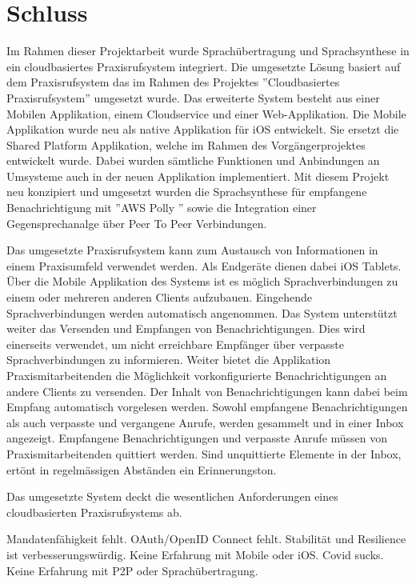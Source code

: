 \section{Schluss}

Im Rahmen dieser Projektarbeit wurde Sprachübertragung und Sprachsynthese in ein cloudbasiertes Praxisrufsystem integriert.
Die umgesetzte Lösung basiert auf dem Praxisrufsystem das im Rahmen des Projektes ''Cloudbasiertes Praxisrufsystem'' umgesetzt wurde.\cite{ip5}
Das erweiterte System besteht aus einer Mobilen Applikation, einem Cloudservice und einer Web-Applikation.
Die Mobile Applikation wurde neu als native Applikation für iOS entwickelt.
Sie ersetzt die Shared Platform Applikation, welche im Rahmen des Vorgängerprojektes entwickelt wurde.
Dabei wurden sämtliche Funktionen und Anbindungen an Umsysteme auch in der neuen Applikation implementiert.
Mit diesem Projekt neu konzipiert und umgesetzt wurden die Sprachsynthese für empfangene Benachrichtigung mit ''AWS Polly '' sowie die Integration einer Gegensprechanalge über Peer To Peer Verbindungen.

Das umgesetzte Praxisrufsystem kann zum Austausch von Informationen in einem Praxisumfeld verwendet werden.
Als Endgeräte dienen dabei iOS Tablets.
Über die Mobile Applikation des Systems ist es möglich Sprachverbindungen zu einem oder mehreren anderen Clients aufzubauen.
Eingehende Sprachverbindungen werden automatisch angenommen.
Das System unterstützt weiter das Versenden und Empfangen von Benachrichtigungen.
Dies wird einerseits verwendet, um nicht erreichbare Empfänger über verpasste Sprachverbindungen zu informieren.
Weiter bietet die Applikation Praxismitarbeitenden die Möglichkeit vorkonfigurierte Benachrichtigungen an andere Clients zu versenden.
Der Inhalt von Benachrichtigungen kann dabei beim Empfang automatisch vorgelesen werden.
Sowohl empfangene Benachrichtigungen als auch verpasste und vergangene Anrufe, werden gesammelt und in einer Inbox angezeigt.
Empfangene Benachrichtigungen und verpasste Anrufe müssen von Praxismitarbeitenden quittiert werden.
Sind unquittierte Elemente in der Inbox, ertönt in regelmässigen Abständen ein Erinnerungston.

Das umgesetzte System deckt die wesentlichen Anforderungen eines cloudbasierten Praxisrufsystems ab.

Mandatenfähigkeit fehlt.
OAuth/OpenID Connect fehlt.
Stabilität und Resilience ist verbesserungswürdig.
Keine Erfahrung mit Mobile oder iOS.
Covid sucks.
Keine Erfahrung mit P2P oder Sprachübertragung.



\clearpage
